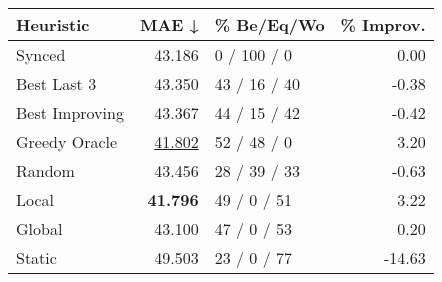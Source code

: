 \begin{tabular}{lrlr}
\toprule
\textbf{Heuristic} & \textbf{MAE ↓} & \textbf{\% Be/Eq/Wo} & \textbf{\% Improv.} \\
\midrule
            Synced &         43.186 &          0 / 100 / 0 &                0.00 \\
\midrule
       Best Last 3 &         43.350 &         43 / 16 / 40 &               -0.38 \\
    Best Improving &         43.367 &         44 / 15 / 42 &               -0.42 \\
\addlinespace
     Greedy Oracle &         \underline{41.802} &          52 / 48 / 0 &                3.20 \\
            Random &         43.456 &         28 / 39 / 33 &               -0.63 \\
\midrule
             Local &         \textbf{41.796} &          49 / 0 / 51 &                3.22 \\
            Global &         43.100 &          47 / 0 / 53 &                0.20 \\
\midrule
            Static &         49.503 &          23 / 0 / 77 &              -14.63 \\
\bottomrule
\end{tabular}

\label{tab:non_lr05_le2_bs2_Summary}
